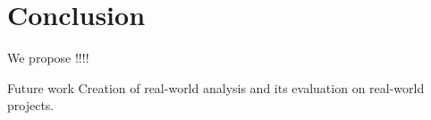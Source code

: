 \section{Conclusion}

We propose !!!!

Future work
Creation of real-world analysis and its evaluation on real-world projects. 
